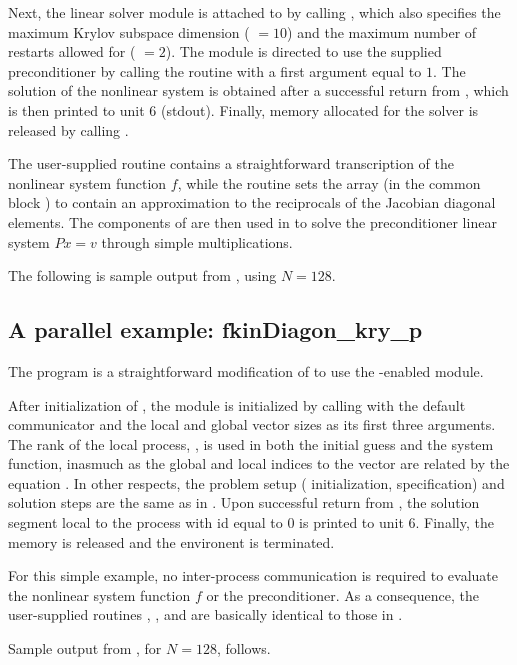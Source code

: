 Next, the {\kinspgmr} linear solver module is attached to {\kinsol} by calling
, which also specifies the maximum Krylov subspace dimension
( $=10$) and the maximum number of restarts allowed for {\spgmr}
( $=2$).  The {\kinspgmr} module is directed to use the supplied
preconditioner by  calling the  routine
with a first argument equal to $1$. The solution of the
nonlinear system is obtained after a successful return from , which
is then printed to unit 6 (stdout).
Finally, memory allocated for the {\kinsol} solver is released by
calling .

The user-supplied routine  contains a straightforward transcription
of the nonlinear system function $f$, while the routine  sets the
array  (in the common block ) to contain an approximation to 
the reciprocals of the Jacobian diagonal elements. The components of  are
then used in  to solve the preconditioner linear system $Px=v$
through simple multiplications.

The following is sample output from , using $N = 128$.



\subsection{A parallel example: fkinDiagon\_kry\_p}\label{ss:fkinDiagon_kry_p}

The program  is a straightforward modification of 
 to use the {\mpi}-enabled {\nvecp} module.

After initialization of {\mpi}, the {\nvecp} module is initialized by calling
 with the default {\mpi} communicator  and
the local and global vector sizes as its first three arguments.
The rank of the local process, , is used in both the initial guess
and the system function, inasmuch as the global and local indices to
the vector  are related by the equation .
In other respects, the problem setup ({\kinsol} initialization, {\kinspgmr} specification)
and solution steps are the same as in . 
Upon successful return from , the solution segment local to 
the process with id equal to $0$ is printed to unit 6.
Finally, the {\kinsol} memory is released and the {\mpi} environent is
terminated. 

For this simple example, no inter-process communication is required to
evaluate the nonlinear system function $f$ or the preconditioner. 
As a consequence, the user-supplied routines , , and
 are basically identical to those in .

Sample output from , for $N=128$, follows.

